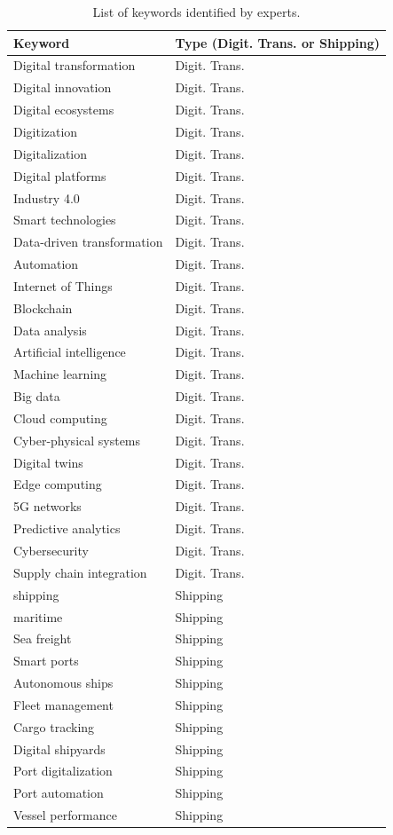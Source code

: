 \documentclass[a4paper, review, endfloat, authoryear]{elsarticle}
\begin{document}
	\begin{table}[h]
		\centering
		\caption{List of keywords identified by experts.}
		\begin{tabularx}{\linewidth}{XX}
			\hline
			Keyword& Type (Digit. Trans. or Shipping) \\
			\hline
			Digital transformation & Digit. Trans. \\
			Digital innovation & Digit. Trans. \\
			Digital ecosystems & Digit. Trans. \\
			Digitization & Digit. Trans. \\
			Digitalization & Digit. Trans. \\
			Digital platforms & Digit. Trans. \\
			Industry 4.0 & Digit. Trans. \\
			Smart technologies & Digit. Trans. \\
			Data-driven transformation & Digit. Trans. \\
			Automation & Digit. Trans. \\
			Internet of Things & Digit. Trans. \\
			Blockchain & Digit. Trans. \\
			Data analysis & Digit. Trans. \\
			Artificial intelligence & Digit. Trans. \\
			Machine learning & Digit. Trans. \\
			Big data & Digit. Trans. \\
			Cloud computing & Digit. Trans. \\
			Cyber-physical systems & Digit. Trans. \\
			Digital twins & Digit. Trans. \\
			Edge computing & Digit. Trans. \\
			5G networks & Digit. Trans. \\
			Predictive analytics & Digit. Trans. \\
			Cybersecurity & Digit. Trans. \\
			Supply chain integration & Digit. Trans. \\
			shipping & Shipping \\
			maritime & Shipping \\
			Sea freight & Shipping \\
			Smart ports & Shipping \\
			Autonomous ships & Shipping \\
			Fleet management & Shipping \\
			Cargo tracking & Shipping \\
			Digital shipyards & Shipping \\
			Port digitalization & Shipping \\
			Port automation & Shipping \\
			Vessel performance & Shipping \\
			\hline
		\end{tabularx}
		\label{tab:keywords}
	\end{table}
	
\end{document}
